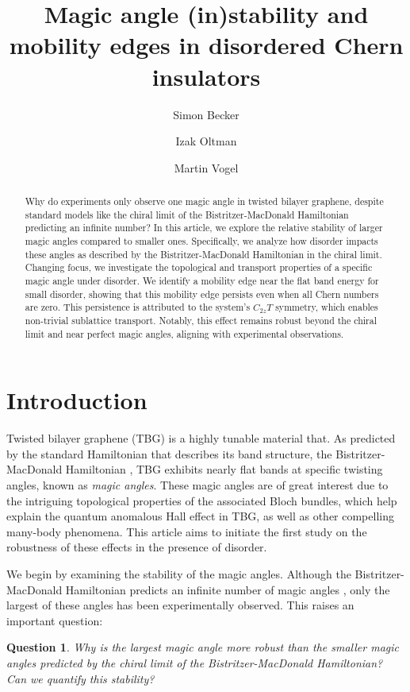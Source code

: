 \documentclass[reqno,12pt,letterpaper]{amsart}
\author{Simon Becker}\thanks{S.B. is the author to whom any correspondence should be addressed}
\author{Izak Oltman}
\author{Martin Vogel}
\newtheorem{que}{Question}
\numberwithin{equation}{section}
\begin{document}
\title[Disordered TBG]{Magic angle (in)stability and mobility edges in disordered Chern insulators} 
\begin{abstract}
Why do experiments only observe one magic angle in twisted bilayer graphene, despite standard models like the chiral limit of the Bistritzer-MacDonald Hamiltonian predicting an infinite number? In this article, we explore the relative stability of larger magic angles compared to smaller ones. Specifically, we analyze how disorder impacts these angles as described by the Bistritzer-MacDonald Hamiltonian in the chiral limit. Changing focus, we investigate the topological and transport properties of a specific magic angle under disorder. We identify a mobility edge near the flat band energy for small disorder, showing that this mobility edge persists even when all Chern numbers are zero. This persistence is attributed to the system's $C_{2z}T$ symmetry, which enables non-trivial sublattice transport. Notably, this effect remains robust beyond the chiral limit and near perfect magic angles, aligning with experimental observations.
\end{abstract}
\maketitle
\section{Introduction}
Twisted bilayer graphene (TBG) is a highly tunable material that. As predicted by the standard Hamiltonian that describes its band structure, the Bistritzer-MacDonald Hamiltonian \cite{BM11}, TBG exhibits nearly flat bands at specific twisting angles, known as \emph{magic angles}\cite{magic}. These magic angles are of great interest due to the intriguing topological properties of the associated Bloch bundles, which help explain the quantum anomalous Hall effect in TBG, as well as other compelling many-body phenomena. This article aims to initiate the first study on the robustness of these effects in the presence of disorder.

We begin by examining the stability of the magic angles. Although the Bistritzer-MacDonald Hamiltonian predicts an infinite number of magic angles \cite{FBM}, only the largest of these angles has been experimentally observed. This raises an important question:
\begin{que}
\label{que0}
Why is the largest magic angle more robust than the smaller magic angles predicted by the chiral limit of the Bistritzer-MacDonald Hamiltonian? Can we quantify this stability?
\end{que}
\end{document}
